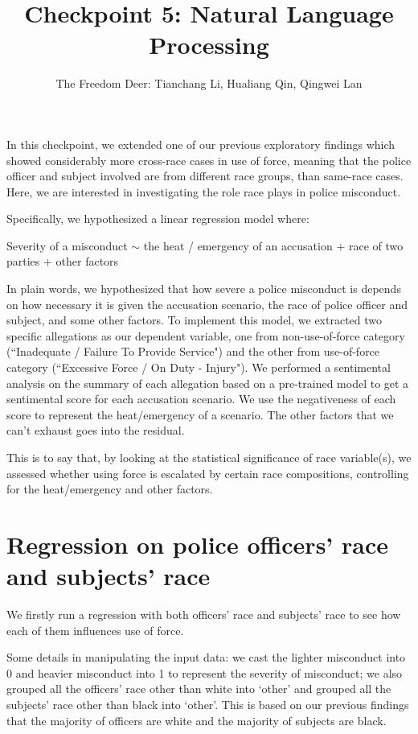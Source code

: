 \documentclass[10pt]{article}
\title{Checkpoint 5: Natural Language Processing}
\author{The Freedom Deer: Tianchang Li, Hualiang Qin, Qingwei Lan}
\begin{document}
\maketitle


In this checkpoint, we extended one of our previous exploratory findings which showed considerably more cross-race cases in use of force, meaning that the police officer and subject involved are from different race groups, than same-race cases. Here, we are interested in investigating the role race plays in police misconduct. 

Specifically, we hypothesized a linear regression model where:

\begin{centering}
Severity of a misconduct $\sim$ the heat / emergency of an accusation + race of two parties + other factors
\end{centering}

In plain words, we hypothesized that how severe a police misconduct is depends on how necessary it is given the accusation scenario, the race of police officer and subject, and some other factors. To implement this model, we extracted two specific allegations as our dependent variable, one from non-use-of-force category (``Inadequate / Failure To Provide Service") and the other from use-of-force category (``Excessive Force / On Duty - Injury"). We performed a sentimental analysis on the summary of each allegation based on a pre-trained model to get a sentimental score for each accusation scenario. We use the negativeness of each score to represent the heat/emergency of a scenario. The other factors that we can’t exhaust goes into the residual.

This is to say that, by looking at the statistical significance of race variable(s), we assessed whether using force is escalated by certain race compositions, controlling for the heat/emergency and other factors.


\section{Regression on police officers’ race and subjects' race}

We firstly run a regression with both officers’ race and subjects’ race to see how each of them influences use of force. 

Some details in manipulating the input data: we cast the lighter misconduct into 0 and heavier misconduct into 1 to represent the severity of misconduct; we also grouped all the officers’ race other than white into ‘other’ and grouped all the subjects’ race other than black into ‘other’. This is based on our previous findings that the majority of officers are white and the majority of subjects are black.
\end{document}
